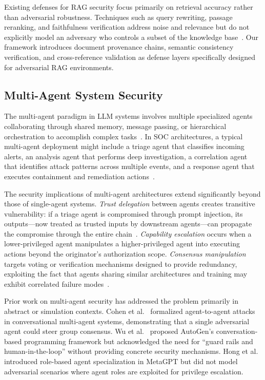 \documentclass[journal,twoside]{IEEEtran}
\begin{document}
Existing defenses for RAG security focus primarily on retrieval accuracy rather than adversarial robustness. Techniques such as query rewriting, passage reranking, and faithfulness verification address noise and relevance but do not explicitly model an adversary who controls a subset of the knowledge base~\cite{gao2024rag}. Our framework introduces document provenance chains, semantic consistency verification, and cross-reference validation as defense layers specifically designed for adversarial RAG environments.

\subsection{Multi-Agent System Security}
\label{sec:bg_multiagent}

The multi-agent paradigm in LLM systems involves multiple specialized agents collaborating through shared memory, message passing, or hierarchical orchestration to accomplish complex tasks~\cite{wu2024autogen,hong2024metagpt,talebirad2023multiagent}. In SOC architectures, a typical multi-agent deployment might include a triage agent that classifies incoming alerts, an analysis agent that performs deep investigation, a correlation agent that identifies attack patterns across multiple events, and a response agent that executes containment and remediation actions~\cite{cohen2024multiagent}.

The security implications of multi-agent architectures extend significantly beyond those of single-agent systems. \emph{Trust delegation} between agents creates transitive vulnerability: if a triage agent is compromised through prompt injection, its outputs---now treated as trusted inputs by downstream agents---can propagate the compromise through the entire chain~\cite{cohen2024multiagent}. \emph{Capability escalation} occurs when a lower-privileged agent manipulates a higher-privileged agent into executing actions beyond the originator's authorization scope. \emph{Consensus manipulation} targets voting or verification mechanisms designed to provide redundancy, exploiting the fact that agents sharing similar architectures and training may exhibit correlated failure modes~\cite{talebirad2023multiagent}.

Prior work on multi-agent security has addressed the problem primarily in abstract or simulation contexts. Cohen et al.~\cite{cohen2024multiagent} formalized agent-to-agent attacks in conversational multi-agent systems, demonstrating that a single adversarial agent could steer group consensus. Wu et al.~\cite{wu2024autogen} proposed AutoGen's conversation-based programming framework but acknowledged the need for ``guard rails and human-in-the-loop'' without providing concrete security mechanisms. Hong et al.~\cite{hong2024metagpt} introduced role-based agent specialization in MetaGPT but did not model adversarial scenarios where agent roles are exploited for privilege escalation.
\end{document}
